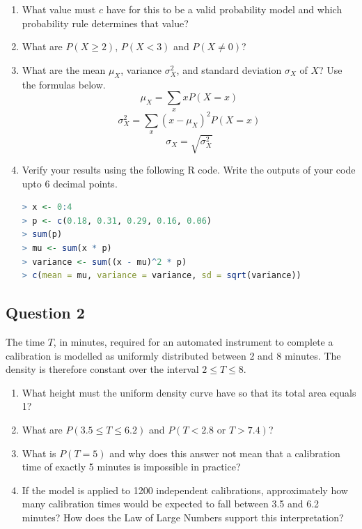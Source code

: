 \documentclass[10pt,letterpaper]{article}
\providecommand{\tightlist}{%
  \setlength{\itemsep}{0pt}\setlength{\parskip}{0pt}}
\begin{document}
\begin{enumerate}
\def\labelenumi{\arabic{enumi}.}
\tightlist
	\item What value must \(c\) have for this to be a valid probability model and which probability rule determines that value?
	\item What are \(P(X\ge 2)\), \(P(X<3)\) and \(P(X\ne 0)\)?
	\item What are the mean \(\mu_X\), variance \(\sigma_X^2\), and standard deviation \(\sigma_X\) of \(X\)? Use the formulas below.
	$$\mu_X = \sum_x xP(X=x)$$
    	$$\sigma_X^2 = \sum_x (x-\mu_X)^2 P(X=x)$$
	$$\sigma_X = \sqrt{\sigma_X^2}$$
	\item Verify your results using the following R code. Write the outputs of your code upto 6 decimal points.
\begin{lstlisting}[language=R]
> x <- 0:4
> p <- c(0.18, 0.31, 0.29, 0.16, 0.06)
> sum(p)
> mu <- sum(x * p)
> variance <- sum((x - mu)^2 * p)
> c(mean = mu, variance = variance, sd = sqrt(variance))
\end{lstlisting}
\end{enumerate}


\subsection*{Question 2} 
The time \(T\), in minutes, required for an automated instrument to complete a calibration is modelled as uniformly distributed between 2 and 8 minutes. The density is therefore constant over the interval
\(2\le T\le8\).
\begin{enumerate}
\def\labelenumi{\arabic{enumi}.}
\tightlist
	\item What height must the uniform density curve have so that its total area equals 1?
	\item What are \(P(3.5\le T\le6.2)\) and \(P(T<2.8\text{ or }T>7.4)\)?
	\item What is \(P(T=5)\) and why does this answer not mean that a calibration time of exactly 5 minutes is impossible in practice?
	\item If the model is applied to 1200 independent calibrations, approximately how many calibration times would be expected to fall between 3.5 and 6.2 minutes? How does the Law of Large Numbers support this interpretation?
\end{enumerate}

\newpage
\end{document}
